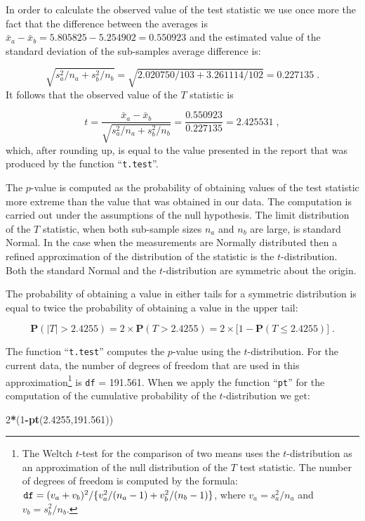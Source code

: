\documentclass[]{krantz}
\makeatletter
\newenvironment{Shaded}{\begin{snugshade}}{\end{snugshade}}
\newcommand{\DecValTok}[1]{\textcolor[rgb]{0.00,0.00,0.81}{#1}}
\newcommand{\FloatTok}[1]{\textcolor[rgb]{0.00,0.00,0.81}{#1}}
\newcommand{\KeywordTok}[1]{\textcolor[rgb]{0.13,0.29,0.53}{\textbf{#1}}}
\newcommand{\NormalTok}[1]{#1}
\newcommand{\OperatorTok}[1]{\textcolor[rgb]{0.81,0.36,0.00}{\textbf{#1}}}
\newcommand{\Prob}{\mathbf{P}}
\newenvironment{kframe}{%
\medskip{}
\setlength{\fboxsep}{.8em}
 \def\at@end@of@kframe{}%
 \ifinner\ifhmode%
  \def\at@end@of@kframe{\end{minipage}}%
  \begin{minipage}{\columnwidth}%
 \fi\fi%
 \def\FrameCommand##1{\hskip\@totalleftmargin \hskip-\fboxsep
 \colorbox{shadecolor}{##1}\hskip-\fboxsep
     \hskip-\linewidth \hskip-\@totalleftmargin \hskip\columnwidth}%
 \MakeFramed {\advance\hsize-\width
   \@totalleftmargin\z@ \linewidth\hsize
   \@setminipage}}%
 {\par\unskip\endMakeFramed%
 \at@end@of@kframe}
\renewenvironment{Shaded}{\begin{kframe}}{\end{kframe}}
\theoremstyle{definition}
\theoremstyle{definition}
\theoremstyle{definition}
\theoremstyle{remark}
\makeatother
\begin{document}
In order to calculate the observed value of the test statistic we use
once more the fact that the difference between the averages is
\(\bar x_a - \bar x_b = 5.805825 - 5.254902 = 0.550923\) and the
estimated value of the standard deviation of the sub-samples average
difference is:

\[\sqrt{s_a^2/n_a + s_b^2/n_b} = \sqrt{2.020750/103 + 3.261114/102} = 0.227135\;.\]
It follows that the observed value of the \(T\) statistic is

\[t = \frac{\bar x_a - \bar x_b}{\sqrt{s_a^2/n_a + s_b^2/n_b}} = \frac{0.550923}{0.227135} = 2.425531\;,\]
which, after rounding up, is equal to the value presented in the report
that was produced by the function ``\texttt{t.test}''.

The \(p\)-value is computed as the probability of obtaining values of the
test statistic more extreme than the value that was obtained in our
data. The computation is carried out under the assumptions of the null
hypothesis. The limit distribution of the \(T\) statistic, when both
sub-sample sizes \(n_a\) and \(n_b\) are large, is standard Normal. In the
case when the measurements are Normally distributed then a refined
approximation of the distribution of the statistic is the
\(t\)-distribution. Both the standard Normal and the \(t\)-distribution are
symmetric about the origin.

The probability of obtaining a value in either tails for a symmetric
distribution is equal to twice the probability of obtaining a value in
the upper tail:

\[\Prob( |T| > 2.4255) = 2 \times \Prob( T > 2.4255) =  2 \times \big [1 - \Prob( T \leq  2.4255)\big ]\;.\]

The function ``\texttt{t.test}'' computes the \(p\)-value using the
\(t\)-distribution. For the current data, the number of degrees of freedom
that are used in this approximation\footnote{The Weltch \(t\)-test for the comparison of two means uses the
  \(t\)-distribution as an approximation of the null distribution of the
  \(T\) test statistic. The number of degrees of freedom is computed by
  the formula:
  \(\mbox{\texttt{df}} = (v_a + v_b)^2/\{v_a^2/(n_a-1) + v_b^2/(n_b-1)\}\),
  where \(v_a = s_a^2/n_a\) and \(v_b = s_b^2/n_b\).} is \texttt{df} = 191.561. When we apply
the function ``\texttt{pt}'' for the computation of the cumulative probability of
the \(t\)-distribution we get:

\begin{Shaded}
\begin{Highlighting}[]
\DecValTok{2}\OperatorTok{*}\NormalTok{(}\DecValTok{1}\OperatorTok{-}\KeywordTok{pt}\NormalTok{(}\FloatTok{2.4255}\NormalTok{,}\FloatTok{191.561}\NormalTok{))}
\end{Highlighting}
\end{Shaded}
\end{document}
